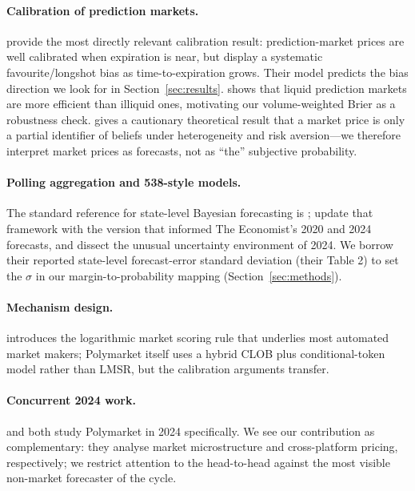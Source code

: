 \documentclass{article}
\begin{document}
\paragraph{Calibration of prediction markets.}
\citet{page2013well} provide the most directly relevant calibration result:
prediction-market prices are well calibrated when expiration is near, but
display a systematic favourite/longshot bias as time-to-expiration grows.
Their model predicts the bias direction we look for in
Section~\ref{sec:results}. \citet{tetlock2008liquidity} shows that liquid
prediction markets are more efficient than illiquid ones, motivating our
volume-weighted Brier as a robustness check. \citet{manski2006interpreting}
gives a cautionary theoretical result that a market price is only a partial
identifier of beliefs under heterogeneity and risk aversion---we therefore
interpret market prices as forecasts, not as ``the'' subjective
probability.

\paragraph{Polling aggregation and 538-style models.}
The standard reference for state-level Bayesian forecasting is
\citet{linzer2013dynamic}; \citet{heidemanns2020updated} update that
framework with the version that informed The Economist's 2020 and 2024
forecasts, and \citet{heidemanns2024grappling} dissect the unusual
uncertainty environment of 2024. We borrow their reported state-level
forecast-error standard deviation (their Table 2) to set the $\sigma$ in
our margin-to-probability mapping (Section~\ref{sec:methods}).

\paragraph{Mechanism design.}
\citet{hanson2003combinatorial} introduces the logarithmic market scoring
rule that underlies most automated market makers; Polymarket itself uses a
hybrid CLOB plus conditional-token model rather than LMSR, but the
calibration arguments transfer.

\paragraph{Concurrent 2024 work.}
\citet{tsang2026anatomy} and \citet{clinton2025prediction} both study
Polymarket in 2024 specifically. We see our contribution as complementary:
they analyse market microstructure and cross-platform pricing,
respectively; we restrict attention to the head-to-head against the most
visible non-market forecaster of the cycle.
\end{document}
